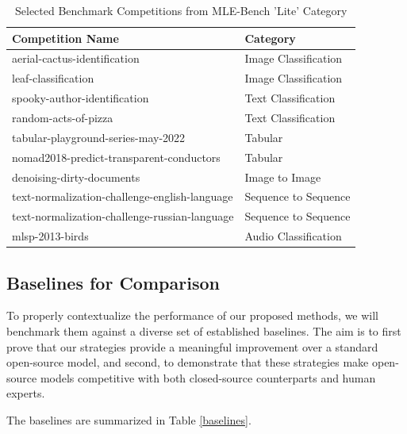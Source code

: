 \begin{table}[htbp]
\centering
\caption{Selected Benchmark Competitions from MLE-Bench 'Lite' Category}
\label{tab:competitions}
\begin{tabular}{ll}
\toprule
\textbf{Competition Name} & \textbf{Category} \\
\midrule
aerial-cactus-identification & Image Classification \\
leaf-classification & Image Classification \\
spooky-author-identification & Text Classification \\
random-acts-of-pizza & Text Classification \\
tabular-playground-series-may-2022 & Tabular \\
nomad2018-predict-transparent-conductors & Tabular \\
denoising-dirty-documents & Image to Image \\
text-normalization-challenge-english-language & Sequence to Sequence \\
text-normalization-challenge-russian-language & Sequence to Sequence \\
mlsp-2013-birds & Audio Classification \\ \hline
\end{tabular}
\end{table}

\subsection{Baselines for Comparison}

To properly contextualize the performance of our proposed methods, we will benchmark them against a diverse set of established baselines. The aim is to first prove that our strategies provide a meaningful improvement over a standard open-source model, and second, to demonstrate that these strategies make open-source models competitive with both closed-source counterparts and human experts.

The baselines are summarized in Table \ref{baselines}.

